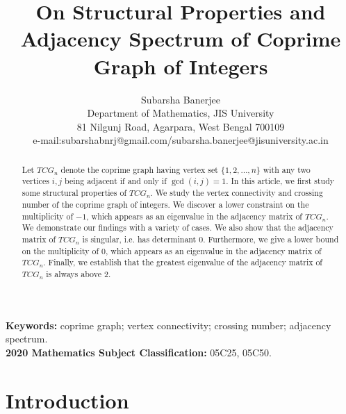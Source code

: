 \documentclass[12pt]{article}
\title{On Structural Properties and Adjacency Spectrum of Coprime Graph of Integers}
\author{Subarsha Banerjee
	\\	Department of  Mathematics,  JIS University 
	\\
	81 Nilgunj Road, Agarpara, West Bengal 700109\\
	e-mail:subarshabnrj@gmail.com/subarsha.banerjee@jisuniversity.ac.in
}
\date{}
\begin{document}
	\maketitle
	
	\begin{abstract}
		Let $TCG_n$ denote the coprime graph having vertex set $\{1,2,\ldots,n\}$ with any two vertices $i,j$ being adjacent if and only if $\gcd(i,j)=1$.
		In this article, we first study some structural properties of $TCG_n$.
		We study the vertex connectivity and crossing number of the coprime graph of integers. We discover a lower constraint on the multiplicity of $-1$, which appears as an eigenvalue in the adjacency matrix of $TCG_n$.
		We demonstrate our findings with a variety of cases.  We also show that the adjacency matrix of $TCG_n$ is singular, i.e. has determinant $0$. Furthermore, we give a lower bound on the multiplicity of   $0$, which appears as an eigenvalue in the adjacency matrix of $TCG_n$.
		Finally, we establish that the greatest eigenvalue of the adjacency matrix of $TCG_n$ is always above $2.$
	\end{abstract}
	\noindent
	\textbf{Keywords:} coprime graph; vertex connectivity; crossing number;
	adjacency spectrum.
	\\
	\textbf{2020 Mathematics Subject Classification:} 05C25, 05C50.
	
	\section{Introduction}
	
\end{document}
